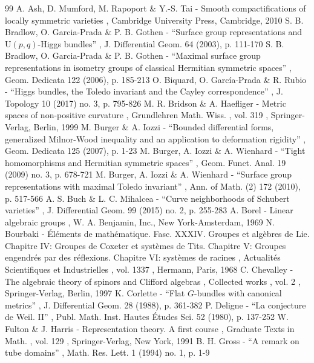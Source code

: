 \documentclass[10pt]{amsart}
\theoremstyle{plain}
\theoremstyle{definition}
\begin{document}
\begin{thebibliography}{99}
 A. Ash, D. Mumford, M. Rapoport \& Y.-S. Tai - Smooth compactifications of locally symmetric varieties , Cambridge University Press, Cambridge, 2010
 S. B. Bradlow, O. Garcia-Prada \& P. B. Gothen - “Surface group representations and $\mathrm{U}(p,q)$-Higgs bundles” , J. Differential Geom. 64 (2003), p. 111-170
 S. B. Bradlow, O. Garcia-Prada \& P. B. Gothen - “Maximal surface group representations in isometry groups of classical Hermitian symmetric spaces” , Geom. Dedicata 122 (2006), p. 185-213
 O. Biquard, O. García-Prada \& R. Rubio - “Higgs bundles, the Toledo invariant and the Cayley correspondence” , J. Topology 10 (2017) no. 3, p. 795-826
 M. R. Bridson \& A. Haefliger - Metric spaces of non-positive curvature , Grundlehren Math. Wiss. , vol. 319 , Springer-Verlag, Berlin, 1999
 M. Burger \& A. Iozzi - “Bounded differential forms, generalized Milnor-Wood inequality and an application to deformation rigidity” , Geom. Dedicata 125 (2007), p. 1-23
 M. Burger, A. Iozzi \& A. Wienhard - “Tight homomorphisms and Hermitian symmetric spaces” , Geom. Funct. Anal. 19 (2009) no. 3, p. 678-721
 M. Burger, A. Iozzi \& A. Wienhard - “Surface group representations with maximal Toledo invariant” , Ann. of Math. (2) 172 (2010), p. 517-566
 A. S. Buch \& L. C. Mihalcea - “Curve neighborhoods of Schubert varieties” , J. Differential Geom. 99 (2015) no. 2, p. 255-283
 A. Borel - Linear algebraic groups , W. A. Benjamin, Inc., New York-Amsterdam, 1969
 N. Bourbaki - Éléments de mathématique. Fasc. XXXIV. Groupes et algèbres de Lie. Chapitre IV: Groupes de Coxeter et systèmes de Tits. Chapitre V: Groupes engendrés par des réflexions. Chapitre VI: systèmes de racines , Actualités Scientifiques et Industrielles , vol. 1337 , Hermann, Paris, 1968
 C. Chevalley - The algebraic theory of spinors and Clifford algebras , Collected works , vol. 2 , Springer-Verlag, Berlin, 1997
 K. Corlette - “Flat $G$-bundles with canonical metrics” , J. Differential Geom. 28 (1988), p. 361-382
 P. Deligne - “La conjecture de Weil. II” , Publ. Math. Inst. Hautes Études Sci. 52 (1980), p. 137-252
 W. Fulton \& J. Harris - Representation theory. A first course , Graduate Texts in Math. , vol. 129 , Springer-Verlag, New York, 1991
 B. H. Gross - “A remark on tube domains” , Math. Res. Lett. 1 (1994) no. 1, p. 1-9

\end{thebibliography}
\end{document}
